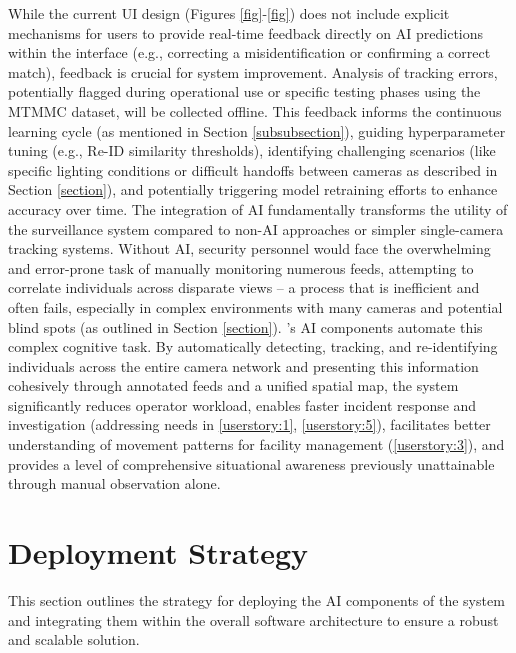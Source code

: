 While the current UI design (Figures \ref{fig}-\ref{fig}) does not include explicit mechanisms for users to provide real-time feedback directly on AI predictions within the interface (e.g., correcting a misidentification or confirming a correct match), feedback is crucial for system improvement. Analysis of tracking errors, potentially flagged during operational use or specific testing phases using the MTMMC dataset, will be collected offline. This feedback informs the continuous learning cycle (as mentioned in Section \ref{subsubsection}), guiding hyperparameter tuning (e.g., Re-ID similarity thresholds), identifying challenging scenarios (like specific lighting conditions or difficult handoffs between cameras as described in Section \ref{section}), and potentially triggering model retraining efforts to enhance accuracy over time.
The integration of AI fundamentally transforms the utility of the surveillance system compared to non-AI approaches or simpler single-camera tracking systems. Without AI, security personnel would face the overwhelming and error-prone task of manually monitoring numerous feeds, attempting to correlate individuals across disparate views – a process that is inefficient and often fails, especially in complex environments with many cameras and potential blind spots (as outlined in Section \ref{section}). \usevar{\srsTitle}'s AI components automate this complex cognitive task. By automatically detecting, tracking, and re-identifying individuals across the entire camera network and presenting this information cohesively through annotated feeds and a unified spatial map, the system significantly reduces operator workload, enables faster incident response and investigation (addressing needs in \ref{userstory:1}, \ref{userstory:5}), facilitates better understanding of movement patterns for facility management (\ref{userstory:3}), and provides a level of comprehensive situational awareness previously unattainable through manual observation alone.

\section{Deployment Strategy}
\label{section:deployment} %
This section outlines the strategy for deploying the AI components of the \usevar{\srsTitle} system and integrating them within the overall software architecture to ensure a robust and scalable solution.

